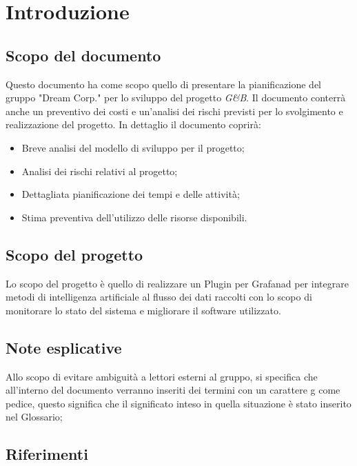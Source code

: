 \section{Introduzione}
		\subsection{Scopo del documento}

			Questo documento ha come scopo quello di presentare la pianificazione del gruppo "Dream Corp." per lo sviluppo del progetto \textit{G\&B}.
			Il documento conterrà anche un preventivo dei costi e un'analisi dei rischi previsti per lo svolgimento e realizzazione del progetto.\newline
			In dettaglio il documento coprirà:
			\begin{itemize}
				\item Breve analisi del modello di sviluppo per il progetto; 
				\item Analisi dei rischi relativi al progetto;
				\item Dettagliata pianificazione dei tempi e delle attività;
				\item Stima preventiva dell'utilizzo delle risorse disponibili.
			\end{itemize}

		\subsection{Scopo del progetto}

			Lo scopo del progetto è quello di realizzare un Plugin per Grafana\ped d per integrare metodi di intelligenza artificiale al flusso dei dati raccolti con lo scopo di monitorare lo stato del sistema e migliorare il software utilizzato.

		\subsection{Note esplicative}

			Allo scopo di evitare ambiguità a lettori esterni al gruppo, si specifica che all'interno del documento verranno inseriti dei termini con un carattere g come pedice, questo significa che il significato inteso in quella situazione è stato inserito nel Glossario;

		\newpage
		\subsection{Riferimenti}


